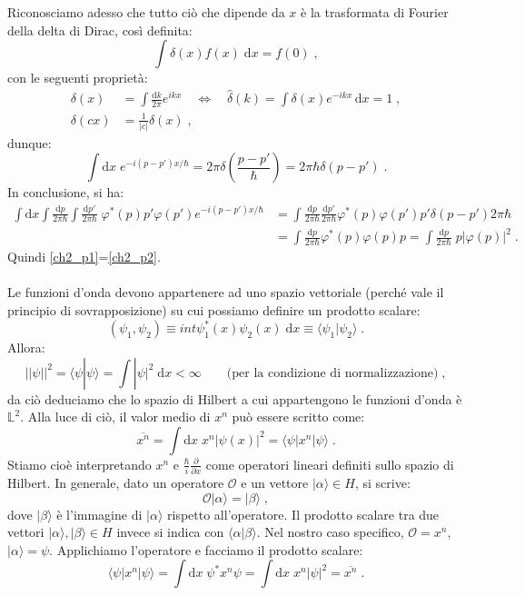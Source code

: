 \documentclass[10pt,a4paper]{report}
\theoremstyle{definition}
\numberwithin{equation}{section}
\newcommand{\diff}[1][]{\mathrm{d}#1}
\newcommand{\bra}{\langle}
\newcommand{\ket}{\rangle}
\begin{document}
Riconosciamo adesso che tutto ciò che dipende da $x$ è la trasformata di Fourier della delta di Dirac, così definita:
$$
\int \delta(x)f(x)\;\diff{x}=f(0)\;,
$$
con le seguenti proprietà:
\begin{align*}
\delta(x) &=\int\frac{\diff{k}}{2\pi}e^{ikx}\quad \Longleftrightarrow\quad \hat{\delta}(k)=\int\delta(x)e^{-ikx}\,\diff{x}=1\;, \\
\delta(cx) &= \frac{1}{|c|}\delta(x)\;,
\end{align*}
dunque:
$$
\int \diff{x}\; e^{-i(p-p')x/\hbar}=2\pi\delta\left(\frac{p-p'}{\hbar}\right)=2\pi\hbar\delta(p-p')\;.
$$
In conclusione, si ha:
\begin{align*}
\int \diff{x}\int\frac{\diff{p}}{2\pi\hbar}\int\frac{\diff{p'}}{2\pi\hbar}\;\varphi^*(p)p'\varphi(p')e^{-i(p-p')x/\hbar} &= \int \frac{\diff{p}}{2\pi\hbar}\frac{\diff{p'}}{2\pi\hbar}\varphi^*(p)\varphi(p')p'\delta(p-p')2\pi\hbar \\
&= \int \frac{\diff{p}}{2\pi\hbar}\varphi^*(p)\varphi(p)p=\int \frac{\diff{p}}{2\pi\hbar}\;p|\varphi(p)|^2\;.
\end{align*}
Quindi \eqref{ch2_p1}=\eqref{ch2_p2}. \\
\\
Le funzioni d'onda devono appartenere ad uno spazio vettoriale (perché vale il principio di sovrapposizione) su cui possiamo definire un prodotto scalare:
$$
(\psi_1,\psi_2)\equiv int \psi_1^*(x)\psi_2(x)\;\diff{x}\equiv \bra \psi_1|\psi_2\ket\;.
$$
Allora:
$$
||\psi||^2=\bra\psi|\psi\ket=\int |\psi|^2\;\diff{x} <\infty \qquad \mbox{(per la condizione di normalizzazione)}\;,
$$
da ciò deduciamo che lo spazio di Hilbert a cui appartengono le funzioni d'onda è $\mathbb{L}^2$. Alla luce di ciò, il valor medio di $x^n$ può essere scritto come:
\begin{equation}
\overline{x^n}=\int \diff{x}\; x^n|\psi(x)|^2=\bra\psi|x^n|\psi\ket\;.
\end{equation}
Stiamo cioè interpretando $x^n$ e $\frac{\hbar}{i}\frac{\partial}{\partial x}$ come operatori lineari definiti sullo spazio di Hilbert. In generale, dato un operatore $\mathcal{O}$ e un vettore $|\alpha\ket \in H$, si scrive:
$$
\mathcal{O}|\alpha\ket=|\beta\ket\;,
$$
dove $|\beta\ket$ è l'immagine di $|\alpha\ket$ rispetto all'operatore. Il prodotto scalare tra due vettori $|\alpha\ket,|\beta\ket\in H$ invece si indica con $\bra\alpha|\beta\ket$. Nel nostro caso specifico, $\mathcal{O}=x^n$, $|\alpha\ket=\psi$. Applichiamo l'operatore e facciamo il prodotto scalare:
$$
\bra\psi|x^n|\psi\ket=\int \diff{x}\;\psi^*x^n\psi=\int\diff{x}\; x^n|\psi|^2=\overline{x^n}\;.
$$
\end{document}
